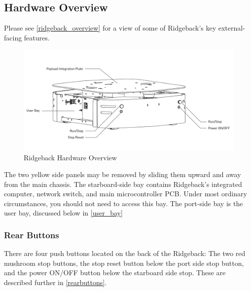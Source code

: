 \documentclass[]{clearpath-latex/clearpath-manual}
\begin{document}
\pagebreak[4]
\subsection{Hardware Overview}

Please see \autoref{ridgeback_overview} for a view of some of Ridgeback's key external-facing features.

\begin{figure}[h]
  \centering
  \includegraphics[width=1\linewidth]{Ridgeback_Rear_Drawing_Labeled.pdf}
  \caption{Ridgeback Hardware Overview}
  \label{ridgeback_overview}
\end{figure}

The two yellow side panels may be removed by sliding them upward and away from the main chassis. The starboard-side bay contains Ridgeback's integrated computer, network switch, and main microcontroller PCB. Under most ordinary circumstances, you should not need to access this bay. The port-side bay is the user bay, discussed below in \autoref{user_bay}


\pagebreak[4]
\subsubsection{Rear Buttons}

There are four push buttons located on the back of the Ridgeback: The two red mushroom stop buttons, the stop reset button below the port side stop button, and the power ON/OFF button below the starboard side stop. These are described further in \autoref{rearbuttons}.
\end{document}
